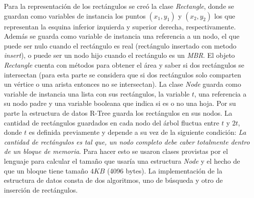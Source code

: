 \documentclass[letterpaper,12pt]{article}
\begin{document}
Para la representaci\'on de los rect\'angulos se cre\'o la clase \textit{Rectangle}, donde se guardan como variables de instancia los puntos $(x_1,y_1)$ y $(x_2,y_2)$ los que representan la esquina inferior izquierda y superior derecha, respectivamente. Adem\'as se guarda como variable de instancia una referencia a un nodo, el que puede ser nulo cuando el rect\'angulo es real (rect\'angulo insertado con metodo \textit{insert}), o puede ser un nodo hijo cuando el rect\'angulo es un \textit{MBR}. El objeto \textit{Rectangle} cuenta con m\'etodos para obtener el \'area y saber si dos rect\'angulos se intersectan (para esta parte se considera que si dos rect\'angulos solo comparten un v\'ertice o una arista entonces no se intersectan).
La clase \textit{Node} guarda como variable de instancia una lista con sus rect\'angulos, la variable $t$, una referencia a su nodo padre y una variable booleana que indica si es o no una hoja.
Por su parte la estructura de datos R-Tree guarda los rect\'angulos en sus nodos. La cantidad de rect\'angulos guardados en cada nodo del \'arbol fluctua entre $t$ y $2t$, donde $t$ es definida previamente y depende a su vez de la siguiente condici\'on: \textit{La cantidad de rect\'angulos es tal que, un nodo completo debe caber totalmente dentro de un bloque de memoria}. Para hacer esto se usaron clases provistas por el lenguaje para calcular el tamaño que usar\'ia una estructura \textit{Node} y el hecho de que un bloque tiene tama\~no $4KB$ (4096 bytes).
La implementaci\'on de la estructura de datos consta de dos algoritmos, uno de b\'usqueda y otro de inserci\'on de rect\'angulos.
\end{document}
